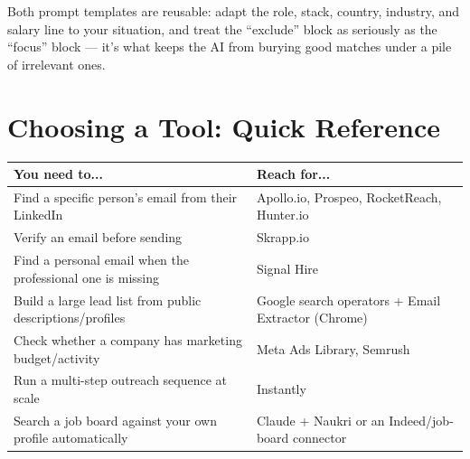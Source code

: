 \begin{keytakeaway}
Both prompt templates are reusable: adapt the role, stack, country, industry, and salary line to your situation,
and treat the ``exclude'' block as seriously as the ``focus'' block — it's what keeps the AI from burying good
matches under a pile of irrelevant ones.
\end{keytakeaway}

\section{Choosing a Tool: Quick Reference}

\begin{longtable}{p{} p{}}
\toprule
\textbf{You need to...} & \textbf{Reach for...} \\
\midrule
\endhead
Find a specific person's email from their LinkedIn & Apollo.io, Prospeo, RocketReach, Hunter.io \\
Verify an email before sending & Skrapp.io \\
Find a personal email when the professional one is missing & Signal Hire \\
Build a large lead list from public descriptions/profiles & Google search operators + Email Extractor
(Chrome) \\
Check whether a company has marketing budget/activity & Meta Ads Library, Semrush \\
Run a multi-step outreach sequence at scale & Instantly \\
Search a job board against your own profile automatically & Claude + Naukri or an Indeed/job-board connector \\
\bottomrule
\end{longtable}


